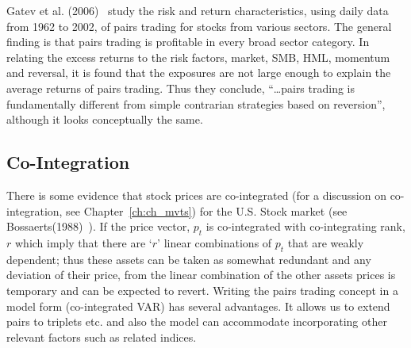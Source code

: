 \noindent{} \twomedskip


Gatev et al. (2006)~\cite{ggr} study the risk and return characteristics, using daily data from 1962 to 2002, of pairs trading for stocks from various sectors. The general finding is that pairs trading is profitable in every broad sector category. In relating the excess returns to the risk factors, market, SMB, HML, momentum and reversal, it is found that the exposures are not large enough to explain the average returns of pairs trading. Thus they conclude, ``\dots pairs trading is fundamentally different from simple contrarian strategies based on reversion'', although it looks conceptually the same. 


\subsection{Co-Integration\label{subsec:co_integ}}

There is some evidence that stock prices are co-integrated (for a discussion on co-integration, see Chapter~\ref{ch:ch_mvts}) for the U.S. Stock market (see Bossaerts(1988)~\cite{bossaerts1988common}). If the price vector, $p_t$ is co-integrated with co-integrating rank, $r$ which imply that there are `$r$' linear combinations of $p_t$ that are weakly dependent; thus these assets can be taken as somewhat redundant and any deviation of their price, from the linear combination of the other assets prices is temporary and can be expected to revert. Writing the pairs trading concept in a model form (co-integrated VAR) has several advantages. It allows us to extend pairs to triplets etc. and also the model can accommodate incorporating other relevant factors such as related indices.


